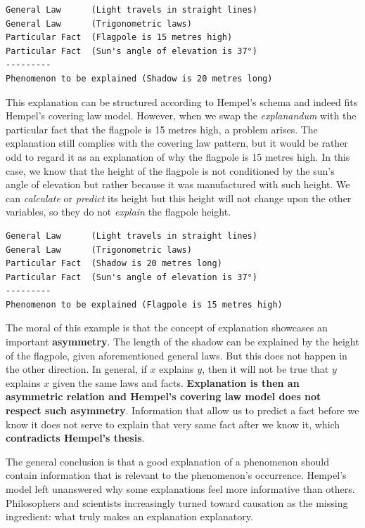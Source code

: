 \documentclass[
  12pt,
]{book}
\begin{document}
\begin{verbatim}
General Law      (Light travels in straight lines)
General Law      (Trigonometric laws)
Particular Fact  (Flagpole is 15 metres high)
Particular Fact  (Sun's angle of elevation is 37°)
---------
Phenomenon to be explained (Shadow is 20 metres long)
\end{verbatim}

This explanation can be structured according to Hempel's schema and indeed fits Hempel's covering law model. However, when we swap the \emph{explanandum} with the particular fact that the flagpole is 15 metres high, a problem arises. The explanation still complies with the covering law pattern, but it would be rather odd to regard it as an explanation of why the flagpole is 15 metres high. In this case, we know that the height of the flagpole is not conditioned by the sun's angle of elevation but rather because it was manufactured with such height. We can \emph{calculate} or \emph{predict} its height but this height will not change upon the other variables, so they do not \emph{explain} the flagpole height.

\begin{verbatim}
General Law      (Light travels in straight lines)
General Law      (Trigonometric laws)
Particular Fact  (Shadow is 20 metres long)
Particular Fact  (Sun's angle of elevation is 37°)
---------
Phenomenon to be explained (Flagpole is 15 metres high)
\end{verbatim}

The moral of this example is that the concept of explanation showcases an important \textbf{asymmetry}. The length of the shadow can be explained by the height of the flagpole, given aforementioned general laws. But this does not happen in the other direction. In general, if \(x\) explains \(y\), then it will not be true that \(y\) explains \(x\) given the same laws and facts. \textbf{Explanation is then an asymmetric relation and Hempel's covering law model does not respect such asymmetry}. Information that allow us to predict a fact before we know it does not serve to explain that very same fact after we know it, which \textbf{contradicts Hempel's thesis}.

The general conclusion is that a good explanation of a phenomenon should contain information that is relevant to the phenomenon's occurrence. Hempel's model left unanswered why some explanations feel more informative than others. Philosophers and scientists increasingly turned toward causation as the missing ingredient: what truly makes an explanation explanatory.
\end{document}
